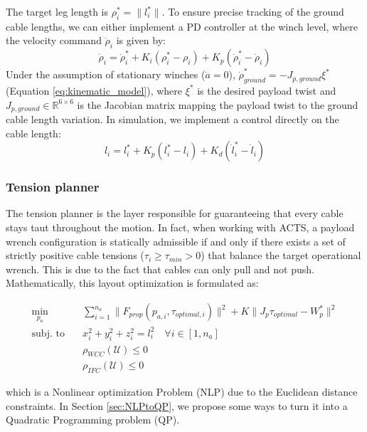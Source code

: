 The target leg length is $\rho_i^* = \|l_i^*\|$. To ensure precise tracking of the ground cable lengths, we can either implement a PD controller at the winch level, where the velocity command $\dot{\rho}_i$ is given by:
\begin{equation}
    \dot{\rho}_i = \dot{\rho}_i^* + K_i (\rho_i^* - \rho_i) + K_p (\dot{\rho}_i^* - \dot{\rho}_i)
\end{equation}
Under the assumption of stationary winches ($\dot{a} = 0$), $\dot{\rho}^*_{ground} = -J_{p, ground} \xi^*$ (Equation \ref{eq:kinematic_model}), where $\xi^*$ is the desired payload twist and $J_{p, ground} \in \mathbb{R}^{6\times 6}$ is the Jacobian matrix mapping the payload twist to the ground cable length variation. In simulation, we implement a control directly on the cable length:
\begin{equation}
    l_i = l_i^* + K_p (l_i^*-l_i) + K_d (\dot{l}_i^* - \dot{l}_i)
\end{equation}



\subsubsection{Tension planner}
The tension planner is the layer responsible for guaranteeing that every cable stays taut throughout the motion. In fact, when working with ACTS, a payload wrench configuration is statically admissible if and only if there exists a set of strictly positive cable tensions ($\tau_i \ge \tau_{min} > 0$) that balance the target operational wrench. This is due to the fact that cables can only pull and not push. Mathematically, this layout optimization is formulated as:

 \begin{equation}
    \begin{aligned}
    \min_{p_a} \quad & \sum_{i=1}^{n_a}\|F_{prop}(p_{a, i}, \tau_{optimal, i})\|^2 + K \|J_p \tau_{optimal} -W_p^*\|^2\\
    \text{subj. to} \quad
    & x_i^2 + y_i^2 + z_i^2 = l_i^2 \quad \forall i \in [1, n_a]\\
    & \rho_{WCC}(\mathcal{U})\le 0\\
    & \rho_{IFC}(\mathcal{U})\le 0
    \end{aligned}
\end{equation} 

which is a Nonlinear optimization Problem (NLP) due to the Euclidean distance constraints. In Section \ref{sec:NLPtoQP}, we propose some ways to turn it into a Quadratic Programming problem (QP).


